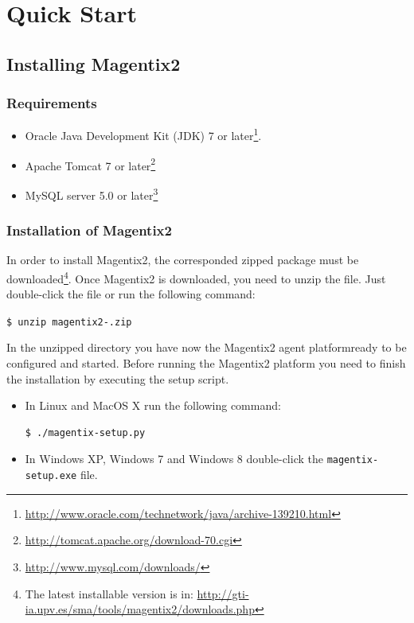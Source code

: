 \chapter{Quick Start} \label{chap:quickstart}
\section{Installing Magentix2} %
\subsection{Requirements}
\begin{itemize}
\item Oracle Java Development Kit (JDK) 7 or later\footnote{\url{http://www.oracle.com/technetwork/java/archive-139210.html}}. %
\item Apache Tomcat 7 or later\footnote{\url{http://tomcat.apache.org/download-70.cgi}}
\item MySQL server 5.0 or later\footnote{\url{http://www.mysql.com/downloads/}}
\end{itemize}


\subsection{Installation of Magentix2}

In order to install Magentix2,  the corresponded zipped package must be downloaded\footnote{The latest installable version is in: \url{http://gti-ia.upv.es/sma/tools/magentix2/downloads.php}}. Once Magentix2 is downloaded, you need to unzip the file. Just double-click the file or run the following command:

\texttt{\$ unzip magentix2-\MagentixVersion.zip}

In the unzipped directory you have now the Magentix2 agent platform\texttrademark ready to be configured and started. Before running the Magentix2 platform you need to finish the installation by executing the setup script.
\begin{itemize}
    \item In Linux and MacOS X run the following command:
        \begin{verbatim}
$ ./magentix-setup.py
        \end{verbatim}
    \item In Windows XP, Windows 7 and Windows 8 double-click the \texttt{magentix-setup.exe} file.
\end{itemize}


